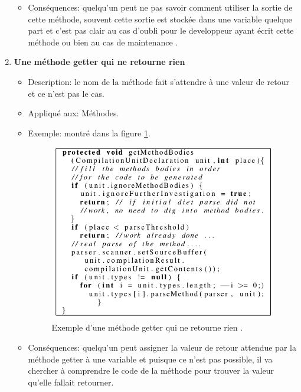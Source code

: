 \begin{enumerate}
\begin{itemize}
\item Conséquences: quelqu’un peut ne pas savoir comment utiliser la sortie de cette méthode, souvent cette sortie est stockée dans une variable quelque part et c’est pas clair au cas d’oubli pour le developpeur ayant écrit cette méthode ou bien au cas de maintenance .
\end{itemize}
\item \textbf{Une méthode getter qui ne retourne rien}
\begin{itemize}
\item Description: le nom de la méthode fait s'attendre à une valeur de retour et ce n’est pas le cas.
\item Appliqué aux: Méthodes.
\item Exemple: montré dans la figure \ref{fig:deux_trois}.
\begin{figure}[H]
	\centering
\includegraphics[width=0.9\linewidth]{Others/Resources/deux_trois.png}
	\caption{Exemple d'une méthode getter qui ne retourne rien \cite{arnaoudova2013new}.}
		\label{fig:deux_trois}
	\end{figure}
\item Conséquences: quelqu’un peut assigner la valeur de retour attendue par la méthode getter à une variable et puisque ce n’est pas possible, il va chercher à comprendre le code de la méthode pour trouver la valeur qu’elle fallait retourner.
\end{itemize}


\end{enumerate}
